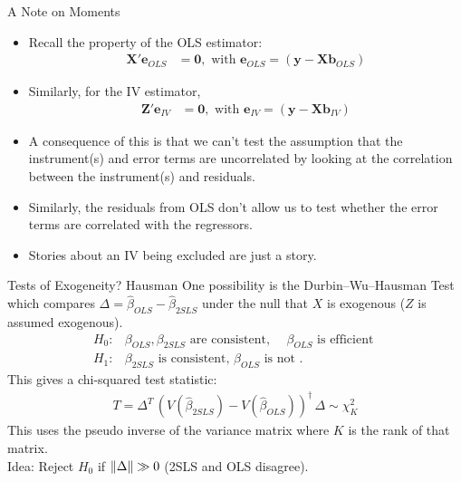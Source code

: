 \documentclass[aspectratio=169,11pt]{beamer}
\begin{document}
\begin{frame}{A Note on Moments}
\begin{itemize}
	\item Recall the property of the OLS estimator:
\begin{align*}
	\mathbf{X}'\mathbf{e}_{OLS}&=\mathbf{0}, \text{ with }
	\mathbf{e}_{OLS}=\left(\mathbf{y}-\mathbf{X}\mathbf{b}_{OLS}\right)
\end{align*}
	\item Similarly, for the IV estimator,
\begin{align*}
	\mathbf{Z}'\mathbf{e}_{IV}&=\mathbf{0}, \text{ with }
	\mathbf{e}_{IV}=\left(\mathbf{y}-\mathbf{X}\mathbf{b}_{IV}\right)
\end{align*}
\item A consequence of this is that we can't
	test the assumption that the instrument(s) and
	error terms are uncorrelated by looking at the
	correlation between the instrument(s) and residuals.

	\smallskip
	\item Similarly, the residuals from OLS don't allow
	us to test whether the error terms are correlated with the
	regressors.
	\item Stories about an IV being \alert{excluded} are \alert{just a story}.
\end{itemize}
\end{frame}



\begin{frame}{Tests of Exogeneity? Hausman}
One possibility is the \alert{Durbin--Wu--Hausman Test} which compares $\Delta = \widehat{\beta}_{OLS} - \widehat{\beta}_{2SLS}$ under the null that $X$ is \alert{exogenous} ($Z$ is assumed exogenous).
\begin{align*}
H_0: & \beta_{OLS}, \beta_{2SLS} \text{ are consistent, }\quad \beta_{OLS} \text{ is efficient }\\
H_1: & \beta_{2SLS} \text{ is consistent, } \beta_{OLS} \text{ is not }.
\end{align*}
This gives a chi-squared test statistic:
\begin{align*}
T = \Delta^T\, (V(\widehat{\beta}_{2SLS}) - V(\widehat{\beta}_{OLS}))^{\dagger}\, \Delta \sim \chi^2_{K}
\end{align*}
This uses the \alert{pseudo inverse} of the variance matrix where $K$ is the rank of that matrix.\\
\medskip
Idea: Reject $H_0$ if $\lVert\Delta\rVert \gg 0$ (2SLS and OLS disagree).
\end{frame}
\end{document}
